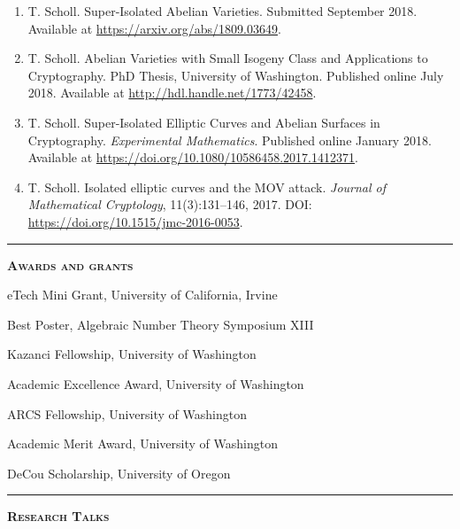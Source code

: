 \documentclass[12pt]{article}
\newcommand{\sectionheading}[1]
{
\bigskip %
\noindent
\hspace{-6.5mm}\textcolor{Gray}{\rule[.75mm]{21.5mm}{1mm}} %
\hspace{.2mm}	%
{\large{\textbf{\textsc{#1}}}} %
}
\newenvironment{date_section}
	{
	\vspace{-1ex}
	\leftmargini = 15ex
		\begin{itemize}[
			labelsep = *,
			labelwidth = 9ex,
			labelindent = 0ex,
			itemindent = !,
			font=\normalfont,
			align=parleft
		]{}
		\itemsep=-1.5mm
	}
	{\end{itemize}\vspace{-2ex}}
\newcommand{\yearmo}[2]{
	\item[
		{\makebox[1ex][r]{#1}}
		\hspace{1ex}
		{\makebox[1ex][l]{#2} }
		] }
\begin{document}
	\begin{enumerate}[itemsep=-1mm, leftmargin=24mm]

	\item T. Scholl. Super-Isolated Abelian Varieties. Submitted September 2018. Available at \url{https://arxiv.org/abs/1809.03649}.

	\item T. Scholl. Abelian Varieties with Small Isogeny Class and Applications to Cryptography. PhD Thesis, University of Washington. Published online July 2018. Available at \url{http://hdl.handle.net/1773/42458}.

	\item T. Scholl. Super-Isolated Elliptic Curves and Abelian Surfaces in Cryptography. \emph{Experimental Mathematics}. Published online January 2018. Available at \url{https://doi.org/10.1080/10586458.2017.1412371}.

	\item T. Scholl. Isolated elliptic curves and the MOV attack. \emph{Journal of Mathematical Cryptology}, 11(3):131--146, 2017. DOI: \url{https://doi.org/10.1515/jmc-2016-0053}.

	\end{enumerate}






	\sectionheading{Awards and grants}%

	\begin{date_section}
		\yearmo{}{2019} %
		eTech Mini Grant, University of California, Irvine
		\yearmo{}{2018} %
		Best Poster, Algebraic Number Theory Symposium XIII
		\yearmo{}{2017}%
		Kazanci Fellowship, University of Washington
		\yearmo{}{2014}%
		Academic Excellence Award, University of Washington
		\yearmo{}{2013}%
		ARCS Fellowship, University of Washington
		\yearmo{}{2013}%
		Academic Merit Award, University of Washington
		\yearmo{}{2012}%
		DeCou Scholarship, University of Oregon
	\end{date_section}






	\sectionheading{Research Talks} %
\end{document}
